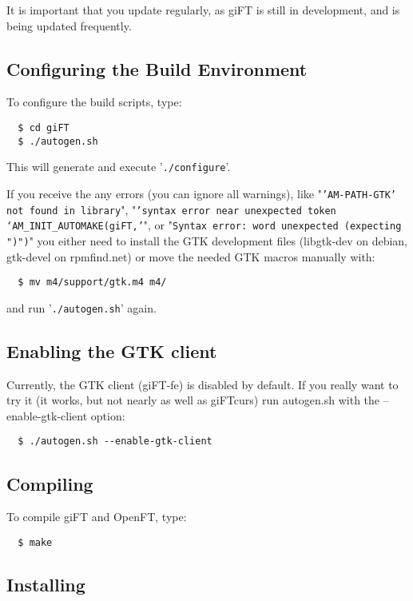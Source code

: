 \documentclass[10pt]{article}
\begin{document}
It is important that you update regularly, as giFT is still in development, 
and is being updated frequently.

\subsection{Configuring the Build Environment}

To configure the build scripts, type:

\begin{verbatim}
  $ cd giFT
  $ ./autogen.sh
\end{verbatim}

This will generate and execute '\verb|./configure|'.

If you receive the any errors (you can ignore all warnings), like 
"\texttt{'AM-PATH-GTK' not found in library}", "\texttt{'syntax error near
unexpected token `AM\_INIT\_AUTOMAKE(giFT,'}", or "\texttt{Syntax error: word
unexpected (expecting ")")}" you either need to install the GTK development
files (libgtk-dev on debian, gtk-devel on rpmfind.net) or move the needed GTK
macros manually with:

\begin{verbatim}
  $ mv m4/support/gtk.m4 m4/
\end{verbatim}

and run '\texttt{./autogen.sh}' again.

\subsection{Enabling the GTK client}
Currently, the GTK client (giFT-fe) is disabled by default. If you really want
to try it (it works, but not nearly as well as giFTcurs) run autogen.sh with
the --enable-gtk-client option:

\begin{verbatim}
  $ ./autogen.sh --enable-gtk-client
\end{verbatim}

\subsection{Compiling}

To compile giFT and OpenFT, type:

\begin{verbatim}
  $ make
\end{verbatim}

\subsection{Installing}
\end{document}
